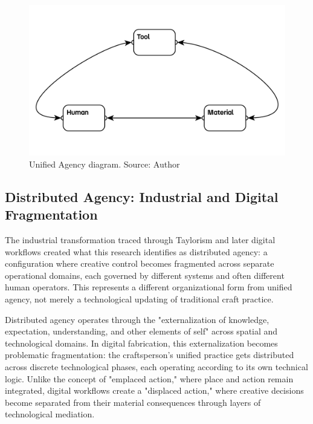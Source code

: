 \begin{figure}[H]
\centering
\includegraphics[width=1\textwidth]{figures/chapter1/traditional making.png}
\caption{Unified Agency diagram. Source: Author}
\label{fig:unified_agency}
\end{figure}

\subsection{Distributed Agency: Industrial and Digital Fragmentation}

The industrial transformation traced through Taylorism and later digital workflows created what this research identifies as distributed agency: a configuration where creative control becomes fragmented across separate operational domains, each governed by different systems and often different human operators. This represents a different organizational form from unified agency, not merely a technological updating of traditional craft practice.

\vspace{0.5cm}

Distributed agency operates through the "externalization of knowledge, expectation, understanding, and other elements of self" across spatial and technological domains. In digital fabrication, this externalization becomes problematic fragmentation: the craftsperson's unified practice gets distributed across discrete technological phases, each operating according to its own technical logic. Unlike the concept of "emplaced action," where place and action remain integrated, digital workflows create a "displaced action," where creative decisions become separated from their material consequences through layers of technological mediation.

